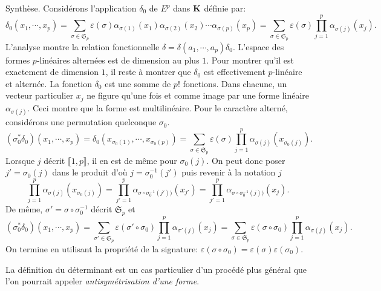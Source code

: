 \begin{demo}
Synthèse.
Considérons l'application $\delta_0$ de $E^p$ dans $\mathbf{K}$ définie par:
\begin{displaymath}
\delta_0(x_1,\cdots,x_p)=  
\sum_{\sigma\in \mathfrak{S}_p}\varepsilon(\sigma)\alpha_{\sigma(1)}(x_1)\alpha_{\sigma(2)}(x_2)\cdots \alpha_{\sigma(p)}(x_p)
= \sum_{\sigma\in \mathfrak{S}_p}\varepsilon(\sigma) \prod_{j=1}^p\alpha_{\sigma(j)}(x_j).
\end{displaymath}
L'analyse montre la relation fonctionnelle $\delta = \delta(a_1,\cdots,a_p)\delta_0$. L'espace des formes $p$-linéaires alternées est de dimension au plus $1$. Pour montrer qu'il est exactement de dimension $1$, il reste à montrer que $\delta_0$ est effectivement $p$-linéaire et alternée.\newline
La fonction $\delta_0$ est une somme de $p!$ fonctions. Dans chacune, un vecteur particulier $x_j$ ne figure qu'une fois et comme image par une forme linéaire $\alpha_{\sigma(j)}$. Ceci montre que la forme est multilinéaire.\newline
Pour le caractère alterné, considérons une permutation quelconque $\sigma_0$.
\begin{displaymath}
 (\sigma_0^*\delta_0)(x_1,\cdots,x_p)=\delta_0(x_{\sigma_0(1)},\cdots,x_{\sigma_0(p)})
= \sum_{\sigma\in \mathfrak{S}_p}\varepsilon(\sigma) \prod_{j=1}^p\alpha_{\sigma(j)}(x_{\sigma_0(j)}).
\end{displaymath}
Lorsque $j$ décrit $\llbracket 1,p\rrbracket$, il en est de même pour $\sigma_0(j)$. On peut donc poser $j'=\sigma_0(j)$ dans le produit d'où $j=\sigma_0^{-1}(j')$ puis revenir à la notation $j$
\begin{displaymath}
\prod_{j=1}^p\alpha_{\sigma(j)}(x_{\sigma_0(j)})
= \prod_{j'=1}^p\alpha_{\sigma\circ \sigma_0^{-1}(j'))}(x_{j'}) 
= \prod_{j'=1}^p\alpha_{\sigma\circ \sigma_0^{-1}(j))}(x_{j}) .
\end{displaymath}
De même, $\sigma' = \sigma \circ \sigma_0^{-1}$ décrit $\mathfrak{S}_p $ et
\begin{displaymath}
 (\sigma_0^*\delta_0)(x_1,\cdots,x_p)
= \sum_{\sigma'\in \mathfrak{S}_p}\varepsilon(\sigma'\circ \sigma_0) \prod_{j=1}^p\alpha_{\sigma'(j)}(x_{j}) 
= \sum_{\sigma\in \mathfrak{S}_p}\varepsilon(\sigma\circ \sigma_0) \prod_{j=1}^p\alpha_{\sigma(j)}(x_{j}) .
\end{displaymath}
On termine en utilisant la propriété de la signature:  $\varepsilon(\sigma\circ \sigma_0)=\varepsilon(\sigma)\varepsilon(\sigma_0)$.
\end{demo}
La définition du déterminant est un cas particulier d'un procédé plus général que l'on pourrait appeler \emph{antisymétrisation d'une forme}.\newline
